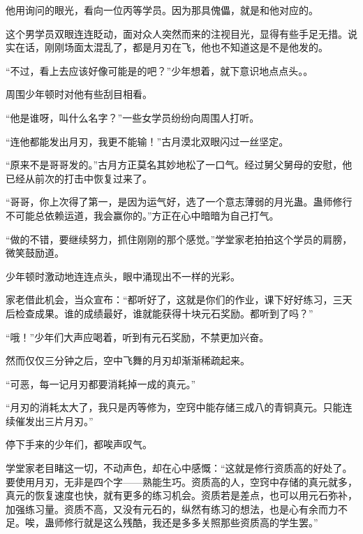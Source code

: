 \begin{this_body}
他用询问的眼光，看向一位丙等学员。因为那具傀儡，就是和他对应的。

这个男学员双眼连连眨动，面对众人突然而来的注视目光，显得有些手足无措。说实在话，刚刚场面太混乱了，都是月刃在飞，他也不知道这是不是他发的。

“不过，看上去应该好像可能是的吧？”少年想着，就下意识地点点头。。

周围少年顿时对他有些刮目相看。

“他是谁呀，叫什么名字？”一些女学员纷纷向周围人打听。

“连他都能发出月刃，我更不能输！”古月漠北双眼闪过一丝坚定。

“原来不是哥哥发的。”古月方正莫名其妙地松了一口气。经过舅父舅母的安慰，他已经从前次的打击中恢复过来了。

“哥哥，你上次得了第一，是因为运气好，选了一个意志薄弱的月光蛊。蛊师修行不可能总依赖运道，我会赢你的。”方正在心中暗暗为自己打气。

“做的不错，要继续努力，抓住刚刚的那个感觉。”学堂家老拍拍这个学员的肩膀，微笑鼓励道。

少年顿时激动地连连点头，眼中涌现出不一样的光彩。

家老借此机会，当众宣布：“都听好了，这就是你们的作业，课下好好练习，三天后检查成果。谁的成绩最好，谁就能获得十块元石奖励。都听到了吗？”

“哦！”少年们大声应喝着，听到有元石奖励，不禁更加兴奋。

然而仅仅三分钟之后，空中飞舞的月刃却渐渐稀疏起来。

“可恶，每一记月刃都要消耗掉一成的真元。”

“月刃的消耗太大了，我只是丙等修为，空窍中能存储三成八的青铜真元。只能连续催发出三片月刃。”

停下手来的少年们，都唉声叹气。

学堂家老目睹这一切，不动声色，却在心中感慨：“这就是修行资质高的好处了。要使用月刃，无非是四个字——熟能生巧。资质高的人，空窍中存储的真元就多，真元的恢复速度也快，就有更多的练习机会。资质若是差点，也可以用元石弥补，加强练习量。资质不高，又没有元石的，纵然有练习的想法，也是心有余而力不足。唉，蛊师修行就是这么残酷，我还是多多关照那些资质高的学生罢。”

\end{this_body}

